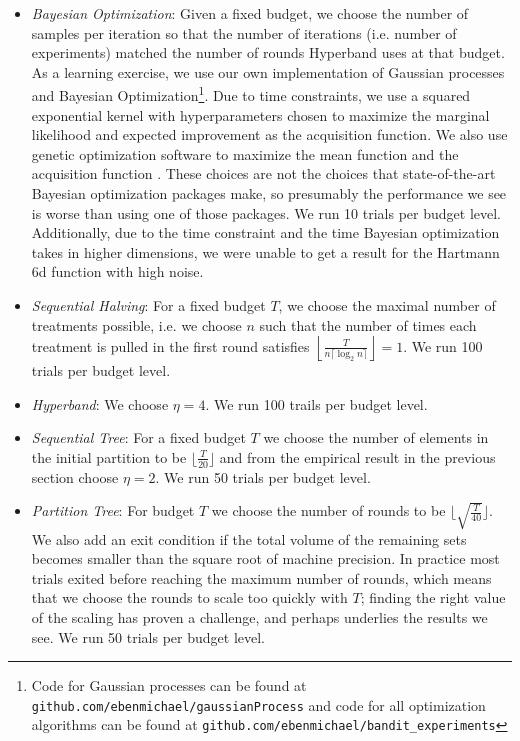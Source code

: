\documentclass[11pt]{article}
\begin{document}
\begin{itemize}
\item {\it Bayesian Optimization}: Given a fixed budget, we choose the number of samples per iteration so that the number of iterations (i.e. number of experiments) matched the number of rounds Hyperband uses at that budget. As a learning exercise, we use our own implementation of Gaussian processes and Bayesian Optimization\footnote{Code for Gaussian processes can be found at \texttt{github.com/ebenmichael/gaussianProcess} and code for all optimization algorithms can be found at \texttt{github.com/ebenmichael/bandit\_experiments}}. Due to time constraints, we use a squared exponential kernel with hyperparameters chosen to maximize the marginal likelihood and expected improvement as the acquisition function. We also use genetic optimization software to maximize the mean function and the acquisition function \cite{Mebane2011}. These choices are not the choices that state-of-the-art Bayesian optimization packages make, so presumably the performance we see is worse than using one of those packages. We run 10 trials per budget level. Additionally, due to the time constraint and the time Bayesian optimization takes in higher dimensions, we were unable to get a result for the Hartmann 6d function with high noise.
\item {\it Sequential Halving}: For a fixed budget $T$, we choose the maximal number of treatments possible, i.e. we choose $n$ such that the number of times each treatment is pulled in the first round satisfies $\left\lfloor \frac{T}{n \lceil \log_2 n \rceil}\right\rfloor = 1$. We run 100 trials per budget level.
\item {\it Hyperband}: We choose $\eta=4$. We run 100 trails per budget level.
\item {\it Sequential Tree}: For a fixed budget $T$ we choose the number of elements in the initial partition to be $\lfloor\frac{T}{20}\rfloor$ and from the empirical result in the previous section choose $\eta=2$. We run 50 trials per budget level.
\item {\it Partition Tree}: For budget $T$ we choose the number of rounds to be $\lfloor \sqrt{\frac{T}{40}} \rfloor$. We also add an exit condition if the total volume of the remaining sets becomes smaller than the square root of machine precision. In practice most trials exited before reaching the maximum number of rounds, which means that we choose the rounds to scale too quickly with $T$; finding the right value of the scaling has proven a challenge, and perhaps underlies the results we see. We run 50 trials per budget level.
\end{itemize}
\end{document}
